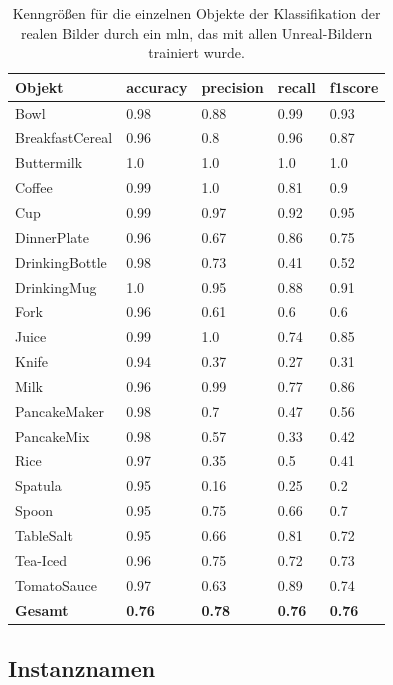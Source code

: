 \begin{table}
\begin{tabularx}{\textwidth}{Xllll}
\textbf{Objekt}	& \textbf{\gls{accuracy}} & \textbf{\gls{precision}}	& \textbf{\gls{recall}}	& \textbf{\gls{f1score}} \\ \hline
Bowl & 0.98 & 0.88 & 0.99 & 0.93 \\  
BreakfastCereal & 0.96 & 0.8 & 0.96 & 0.87 \\  
Buttermilk & 1.0 & 1.0 & 1.0 & 1.0 \\  
Coffee & 0.99 & 1.0 & 0.81 & 0.9 \\  
Cup & 0.99 & 0.97 & 0.92 & 0.95 \\  
DinnerPlate & 0.96 & 0.67 & 0.86 & 0.75 \\  
DrinkingBottle & 0.98 & 0.73 & 0.41 & 0.52 \\  
DrinkingMug & 1.0 & 0.95 & 0.88 & 0.91 \\  
Fork & 0.96 & 0.61 & 0.6 & 0.6 \\  
Juice & 0.99 & 1.0 & 0.74 & 0.85 \\  
Knife & 0.94 & 0.37 & 0.27 & 0.31 \\  
Milk & 0.96 & 0.99 & 0.77 & 0.86 \\  
PancakeMaker & 0.98 & 0.7 & 0.47 & 0.56 \\  
PancakeMix & 0.98 & 0.57 & 0.33 & 0.42 \\  
Rice & 0.97 & 0.35 & 0.5 & 0.41 \\  
Spatula & 0.95 & 0.16 & 0.25 & 0.2 \\  
Spoon & 0.95 & 0.75 & 0.66 & 0.7 \\  
TableSalt & 0.95 & 0.66 & 0.81 & 0.72 \\  
Tea-Iced & 0.96 & 0.75 & 0.72 & 0.73 \\  
TomatoSauce & 0.97 & 0.63 & 0.89 & 0.74 \\   \hline
\textbf{Gesamt}		&	\textbf{0.76}   &	\textbf{0.78}  & \textbf{0.76}     &  \textbf{0.76}     \\
\end{tabularx}
\caption[Objekt-spezifische Kenngrößen der Klassifikation mit Unreal-Trainingsset und Real-Testset]{Kenngrößen für die einzelnen Objekte der Klassifikation der realen Bilder durch ein \gls{mln}, das mit allen Unreal-Bildern trainiert wurde.}
\label{tab:UnrealRealGTClass_metrics}
\end{table}

\subsection{Instanznamen}

